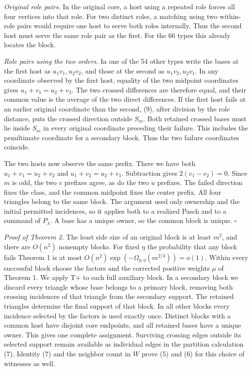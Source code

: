 \documentclass[english,11pt,a4paper]{article}
\newcounter{none}
\begin{document}
\emph{Original role pairs.} In the original core, a host using a repeated role forces all four vertices into that role. For two distinct roles, a matching using two within-role pairs would require one host to serve both roles internally. Thus the second host must serve the same role pair as the first. For the 66 types this already locates the block.

\emph{Role pairs using the two orders.} In one of the 54 other types write the bases at the first host as \(u_1v_1,u_2v_2\), and those at the second as \(u_1v_2,u_2v_1\). In any coordinate observed by the first host, equality of the two midpoint coordinates gives \(u_1+v_1=u_2+v_2\). The two crossed differences are therefore equal, and their common value is the average of the two direct differences. If the first host fails at an earlier original coordinate than the second, (9), after division by the role distance, puts the crossed direction outside \(S_m\). Both retained crossed bases must lie inside \(S_m\) in every original coordinate preceding their failure. This includes the penultimate coordinate for a secondary block. Thus the two failure coordinates coincide.

The two hosts now observe the same prefix. There we have both \(u_1+v_1=u_2+v_2\) and \(u_1+v_2=u_2+v_1\). Subtraction gives \(2(v_1-v_2)=0\). Since \(m\) is odd, the two \(v\) prefixes agree, as do the two \(u\) prefixes. The failed direction fixes the class, and the common midpoint fixes the center prefix. All four triangles belong to the same block. The argument used only ownership and the initial permitted incidences, so it applies both to a realized Pasch and to a summand of \(P_\lambda\). A base has a unique owner, so the common block is unique. \(\square\)

\emph{Proof of Theorem 2.} The least side size of an original block is at least \(m^2\), and there are \(O(n^2)\) nonempty blocks. For fixed \(\eta\) the probability that any block fails Theorem 1 is at most \(O(n^2)\exp(-\Omega_{p,\eta}(m^{2/3}))=o(1)\). Within every successful block choose the factors and the corrected positive weights \(\mu\) of Theorem 1. We apply T+ to each full auxiliary block. In a secondary block we discard every triangle whose base belongs to a primary block, removing both crossing incidences of that triangle from the secondary support. The retained triangles determine the final support of that block. In all other blocks every incidence selected by the factors is used exactly once. Distinct blocks with a common host have disjoint core endpoints, and all retained bases have a unique owner. This gives one complete assignment. Surviving crossing edges outside its selected support remain available as individual edges in the partition calculation (7). Identity (7) and the neighbor count in \(W\) prove (5) and (6) for this choice of witnesses as well.
\end{document}
